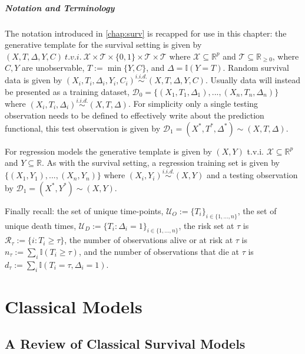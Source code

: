 \documentclass[
  letterpaper,
]{scrbook}
\let\oldparagraph\paragraph
\renewcommand{\paragraph}[1]{\oldparagraph{#1}\mbox{}}
\theoremstyle{plain}
\theoremstyle{definition}
\theoremstyle{remark}
\begin{document}
\paragraph{Notation and Terminology}

The notation introduced in \ref{chap:surv} is recapped for use in this
chapter: the generative template for the survival setting is given by
\((X,T,\Delta,Y,C) \ t.v.i. \ \mathcal{X}\times \mathcal{T}\times \{0,1\}\times \mathcal{T}\times \mathcal{T}\)
where \(\mathcal{X}\subseteq \mathbb{R}^p\) and
\(\mathcal{T}\subseteq \mathbb{R}_{\geq 0}\), where \(C,Y\) are
unobservable, \(T := \min\{Y,C\}\), and \(\Delta = \mathbb{I}(Y = T)\).
Random survival data is given by
\((X_i,T_i,\Delta_i,Y_i,C_i) \stackrel{i.i.d.}\sim(X,T,\Delta,Y,C)\).
Usually data will instead be presented as a training dataset,
\(\mathcal{D}_0= \{(X_1,T_1,\Delta_1),...,(X_n,T_n,\Delta_n)\}\) where
\((X_i,T_i,\Delta_i) \stackrel{i.i.d.}\sim(X,T,\Delta)\). For simplicity
only a single testing observation needs to be defined to effectively
write about the prediction functional, this test observation is given by
\(\mathcal{D}_1= (X^*, T^*, \Delta^*) \sim (X,T,\Delta)\).

For regression models the generative template is given by \((X,Y)\)
t.v.i. \(\mathcal{X}\subseteq \mathbb{R}^p\) and
\(Y \subseteq \mathbb{R}\). As with the survival setting, a regression
training set is given by \(\{(X_1,Y_1),...,(X_n,Y_n)\}\) where
\((X_i,Y_i) \stackrel{i.i.d.}\sim(X,Y)\) and a testing observation by
\(\mathcal{D}_1= (X^*,Y^*) \sim (X,Y)\).

Finally recall: the set of unique time-points,
\(\mathcal{U}_O := \{T_i\}_{i \in \{1,...,n\}}\), the set of unique
death times,
\(\mathcal{U}_D := \{T_i : \Delta_i = 1\}_{i \in \{1,...,n\}}\), the
risk set at \(\tau\) is \(\mathcal{R}_\tau := \{i: T_i \geq \tau\}\),
the number of observations alive or at risk at \(\tau\) is
\(n_\tau := \sum_i \mathbb{I}(T_i \geq \tau)\), and the number of
observations that die at \(\tau\) is
\(d_\tau := \sum_i \mathbb{I}(T_i = \tau, \Delta_i = 1)\).


\hypertarget{classical-models}{%
\chapter{Classical Models}\label{classical-models}}

\section{A Review of Classical Survival Models}
\label{sec:surv_models}
\end{document}
